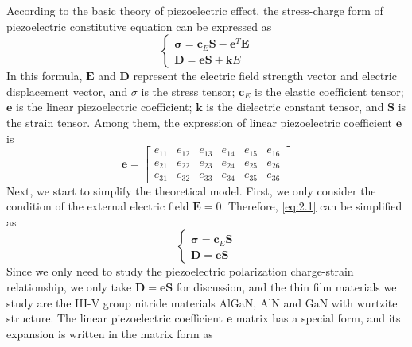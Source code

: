 According to the basic theory of piezoelectric  effect, the stress-charge form of piezoelectric constitutive equation  can be expressed as
\begin{equation}
\left\{\begin{array}{c}
\boldsymbol{\sigma}=\boldsymbol{c}_{E} \boldsymbol{S}-\boldsymbol{e}^{T} \boldsymbol{E} \\
\boldsymbol{D}=\boldsymbol{e} \boldsymbol{S}+\boldsymbol{k} E
\end{array}\right.
\label{eq:2.1}
\end{equation}
In this formula, $\boldsymbol{E}$ and $\boldsymbol{D}$ represent the electric  field strength vector and  electric displacement vector, and $\sigma$ is the stress tensor; $\boldsymbol{c}_{E}$ is the  elastic coefficient tensor; $\boldsymbol{e}$ is the linear piezoelectric  coefficient; $\boldsymbol{k}$ is the dielectric constant tensor, and $\boldsymbol{S}$ is the strain  tensor.
Among them, the expression of linear  piezoelectric coefficient $\boldsymbol{e}$ is
\begin{equation}
\boldsymbol{e}=\begin{bmatrix}
e_{11} & e_{12} & e_{13} & e_{14} & e_{15} & e_{16} \\
e_{21} & e_{22} & e_{23} & e_{24} & e_{25} & e_{26} \\
e_{31} & e_{32} & e_{33} & e_{34} & e_{35} & e_{36}
\end{bmatrix}
\label{eq:2.2}
\end{equation}
Next, we start to simplify the theoretical model. First, we only consider the condition of the external  electric field $\boldsymbol{E} = 0$. Therefore, \autoref{eq:2.1} can be simplified as
\begin{equation}
\left\{\begin{array}{c}
\boldsymbol{\sigma}=\boldsymbol{c}_{E} \boldsymbol{S}\\
\boldsymbol{D}=\boldsymbol{e} \boldsymbol{S}
\end{array}\right.
\label{eq:2.3}
\end{equation}
Since we only need to study the  piezoelectric polarization charge-strain  relationship, we only take $\boldsymbol{D}=\boldsymbol{e} \boldsymbol{S}$ for discussion, and the thin film  materials we study are the III-V group nitride materials AlGaN, AlN and GaN with wurtzite  structure. The linear piezoelectric  coefficient $\boldsymbol{e}$ matrix has a special form, and its expansion is written in the matrix form as
